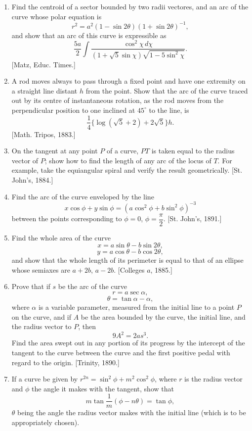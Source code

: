 \documentclass[11pt, a4paper]{article}
\newcommand{\source}[1]{\hfill\textnormal{[#1]}}
\begin{document}
\begin{enumerate}[leftmargin=2em]
\item Find the centroid of a sector bounded by two radii vectores, and an arc of the curve whose polar equation is
\[
r^2=a^2(1-\sin2\theta)(1+\sin2\theta)^{-1},
\]
and show that an arc of this curve is expressible as
\[
\frac{5a}{2}\int\frac{\cos^2\chi\,d\chi}{(1+\sqrt5\sin\chi)\sqrt{1-5\sin^2\chi}}.
\]
\source{Matz, Educ. Times.}

\item A rod moves always to pass through a fixed point and have one extremity on a straight line distant $h$ from the point. Show that the arc of the curve traced out by its centre of instantaneous rotation, as the rod moves from the perpendicular position to one inclined at $45^\circ$ to the line, is
\[
\frac14\{\log(\sqrt5+2)+2\sqrt5\}h.
\]
\source{Math. Tripos, 1883.}

\item On the tangent at any point $P$ of a curve, $PT$ is taken equal to the radius vector of $P$; show how to find the length of any arc of the locus of $T$. For example, take the equiangular spiral and verify the result geometrically. \source{St. John's, 1884.}

\item Find the arc of the curve enveloped by the line
\[
x\cos\phi+y\sin\phi=(a\cos^2\phi+b\sin^2\phi)^{-3}
\]
between the points corresponding to $\phi=0$, $\phi=\dfrac{\pi}{2}$. \source{St. John's, 1891.}

\item Find the whole area of the curve
\[
x=a\sin\theta-b\sin2\theta,
\]
\[
y=a\cos\theta-b\cos2\theta,
\]
and show that the whole length of its perimeter is equal to that of an ellipse whose semiaxes are $a+2b$, $a-2b$. \source{Colleges $a$, 1885.}

\item Prove that if $s$ be the arc of the curve
\[
r=a\sec\alpha,
\]
\[
\theta=\tan\alpha-\alpha,
\]
where $\alpha$ is a variable parameter, measured from the initial line to a point $P$ on the curve, and if $A$ be the area bounded by the curve, the initial line, and the radius vector to $P$, then
\[
9A^2=2as^3.
\]
Find the area swept out in any portion of its progress by the intercept of the tangent to the curve between the curve and the first positive pedal with regard to the origin. \source{Trinity, 1890.}

\item If a curve be given by $r^{2n}=\sin^2\phi+m^2\cos^2\phi$, where $r$ is the radius vector and $\phi$ the angle it makes with the tangent, show that
\[
m\tan\frac1m(\phi-n\theta)=\tan\phi,
\]
$\theta$ being the angle the radius vector makes with the initial line (which is to be appropriately chosen).


\end{enumerate}
\end{document}
